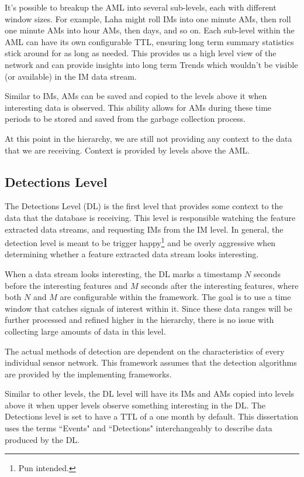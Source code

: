 It's possible to breakup the AML into several sub-levels, each with different window sizes. For example, Laha might roll IMs into one minute AMs, then roll one minute AMs into hour AMs, then days, and so on. Each sub-level within the AML can have its own configurable TTL, ensuring long term summary statistics stick around for as long as needed. This provides us a high level view of the network and can provide insights into long term Trends which wouldn't be visible (or available) in the IM data stream.

Similar to IMs, AMs can be saved and copied to the levels above it when interesting data is observed. This ability allows for AMs during these time periods to be stored and saved from the garbage collection process.

At this point in the hierarchy, we are still not providing any context to the data that we are receiving. Context is provided by levels above the AML\@.

\subsection{Detections Level}\label{subsec:detections-level}
The Detections Level (DL) is the first level that provides some context to the data that the database is receiving. This level is responsible watching the feature extracted data streams, and requesting IMs from the IM level. In general, the detection level is meant to be trigger happy\footnote{Pun intended.} and be overly aggressive when determining whether a feature extracted data stream looks interesting.

When a data stream looks interesting, the DL marks a timestamp $N$ seconds before the interesting features and $M$ seconds after the interesting features, where both $N$ and $M$ are configurable within the framework. The goal is to use a time window that catches signals of interest within it. Since these data ranges will be further processed and refined higher in the hierarchy, there is no issue with collecting large amounts of data in this level.

The actual methods of detection are dependent on the characteristics of every individual sensor network. This framework assumes that the detection algorithms are provided by the implementing frameworks.

Similar to other levels, the DL level will have its IMs and AMs copied into levels above it when upper levels observe something interesting in the DL. The Detections level is set to have a TTL of a one month by default. This dissertation uses the terms ``Events" and ``Detections" interchangeably to describe data produced by the DL.

